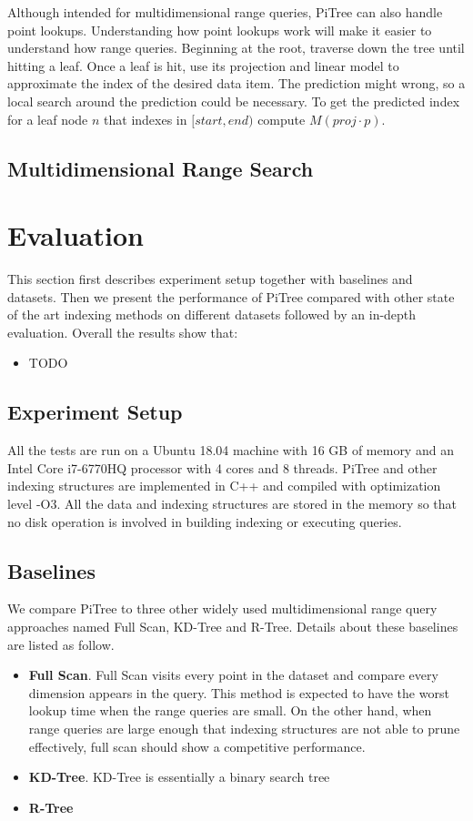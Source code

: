 \documentclass[sigconf,10pt]{acmart}
\begin{document}
Although intended for multidimensional range queries,
PiTree can also handle point lookups. Understanding how point lookups
work will make it easier to understand how range queries.
Beginning at the root, traverse down the tree until hitting a leaf.
Once a leaf is hit, use its projection and linear model to approximate
the index of the desired data item. The prediction might wrong,
so a local search around the prediction could be necessary.
To get the predicted index for a leaf node $n$ that indexes in $[start, end)$
compute $M(proj \cdot p)$.

\subsection{Multidimensional Range Search}

\section{Evaluation}

This section first describes experiment setup together with baselines and datasets. 
Then we present the performance of PiTree compared with other state of the art 
indexing methods on different datasets followed by an in-depth evaluation. 
Overall the results show that:
\begin{itemize}
    \item TODO
\end{itemize}

\subsection{Experiment Setup}

All the tests are run on a Ubuntu 18.04 machine with 16 GB of memory and an Intel 
Core i7-6770HQ processor with 4 cores and 8 threads. PiTree and other indexing 
structures are implemented in C++ and compiled with optimization level -O3. 
All the data and indexing structures are stored in the memory so that no disk 
operation is involved in building indexing or executing queries.

\subsection{Baselines}

We compare PiTree to three other widely used multidimensional range query approaches 
named Full Scan, KD-Tree and R-Tree. Details about these baselines are listed 
as follow. 
\begin{itemize}
    \item \textbf{Full Scan}. Full Scan visits every point in the dataset and 
    compare every dimension appears in the query. This method is expected to have 
    the worst lookup time when the range queries are small. On the other hand, 
    when range queries are large enough that indexing structures are not able to 
    prune effectively, full scan should show a competitive performance.
    \item \textbf{KD-Tree}. KD-Tree is essentially a binary search tree 
    \item \textbf{R-Tree}
\end{itemize}
\end{document}
